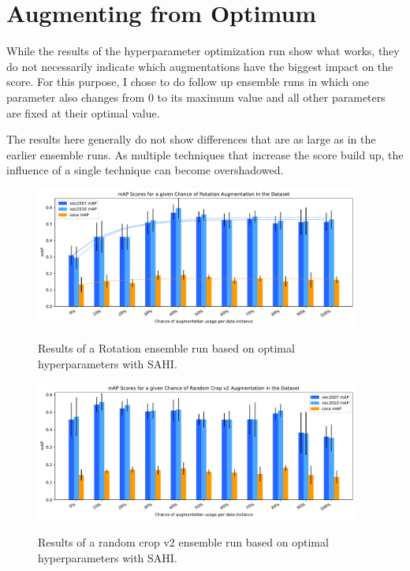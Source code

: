 \documentclass[10pt]{book}
\begin{document}
\section{Augmenting from Optimum}

While the results of the hyperparameter optimization run show what works, they do not necessarily indicate which augmentations have the biggest impact on the score. For this purpose, I chose to do follow up ensemble runs in which one parameter also changes from 0 to its maximum value and all other parameters are fixed at their optimal value.

The results here generally do not show differences that are as large as in the earlier ensemble runs. As multiple techniques that increase the score build up, the influence of a single technique can become overshadowed.

\begin{figure}
  \caption{Results of a Rotation ensemble run based on optimal hyperparameters with \ac{SAHI}.}
  \includegraphics[width=0.95\textwidth]{image/hyp-based-rot-sahi-ensemble-2-thesis-2}
  \label{fig:hyp_based_rot_plot}
\end{figure}

\begin{figure}
  \caption{Results of a random crop v2 ensemble run based on optimal hyperparameters with \ac{SAHI}.}
  \includegraphics[width=0.95\textwidth]{image/hyp-based-rc2-sahi-ensemble-2-thesis-2}
  \label{fig:hyp_based_rc2_plot}
\end{figure}
\end{document}
